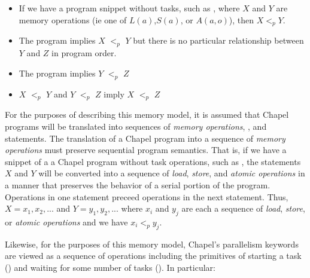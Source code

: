 \begin{itemize}

  \item If we have a program snippet without tasks, such as , where
$X$ and $Y$ are memory operations (ie one of $L(a)$,$S(a)$, or $A(a,o)$), then
$X <_p Y$.

  \item The program  implies $X$ $<_p$ $Y$ but there is
no particular relationship between $Y$ and $Z$ in program order.

  \item The program  implies $Y$ $<_p$ $Z$
  \item $X$ $<_p$ $Y$ and $Y$ $<_p$ $Z$ imply $X$ $<_p$ $Z$
\end{itemize}

For the purposes of describing this memory model, it is assumed that Chapel
programs will be translated into sequences of \textit{memory operations},
, and  statements. The translation of a Chapel program
into a sequence of \textit{memory operations} must preserve sequential program
semantics. That is, if we have a snippet of a a Chapel program without task
operations, such as , the statements $X$ and $Y$ will be converted
into a sequence of \textit{load}, \textit{store}, and \textit{atomic
operations} in a manner that preserves the behavior of a serial portion of the
program. Operations in one statement preceed operations in the next statement.
Thus, $X=x_1,x_2,...$ and $Y=y_1,y_2,...$ where $x_i$ and $y_j$ are each a
sequence of \textit{load}, \textit{store}, or \textit{atomic operations} and we
have $x_i <_p y_j$.

Likewise, for the purposes of this memory model, Chapel's parallelism keywords
are viewed as a sequence of operations including the primitives of starting a
task () and waiting for some number of tasks
(). In particular:

